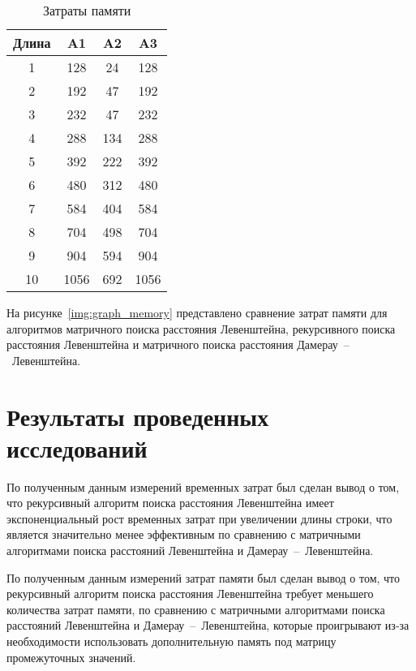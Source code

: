 \begin{center}
    \captionsetup{justification=raggedright,singlelinecheck=off}
    \begin{longtable}[c]{|c|c|c|c|}
    \caption{Затраты памяти\label{tbl:memory}} \\ \hline
		Длина & A1 & A2 & A3 \\ \hline
		1 & 128 & 24 & 128 \\\hline
		2 & 192 & 47 & 192 \\\hline
		3 & 232 & 47 & 232 \\\hline
		4 & 288 & 134 & 288 \\\hline
		5 & 392 & 222 & 392 \\\hline
		6 & 480 & 312 & 480 \\\hline
		7 & 584 & 404 & 584 \\\hline
		8 & 704 & 498 & 704 \\\hline
		9 & 904 & 594 & 904 \\\hline
	   10 & 1056 & 692 & 1056 \\\hline
	\end{longtable}
\end{center}

На рисунке~\ref{img:graph_memory} представлено сравнение затрат памяти для алгоритмов матричного поиска расстояния Левенштейна, рекурсивного поиска расстояния Левенштейна и матричного поиска расстояния Дамерау~--~Левенштейна.

\FloatBarrier
{}
\FloatBarrier


\section{Результаты проведенных исследований}

По полученным данным измерений временных затрат был сделан вывод о том, что рекурсивный алгоритм поиска расстояния Левенштейна имеет экспоненциальный рост временных затрат при увеличении длины строки, что является значительно менее эффективным по сравнению с матричными алгоритмами поиска расстояний Левенштейна и Дамерау~--~Левенштейна.

По полученным данным измерений затрат памяти был сделан вывод о том, что рекурсивный алгоритм поиска расстояния Левенштейна требует меньшего количества затрат памяти, по сравнению с матричными алгоритмами поиска расстояний Левенштейна и Дамерау~--~Левенштейна, которые проигрывают из-за необходимости использовать дополнительную память под матрицу промежуточных значений.

\clearpage
